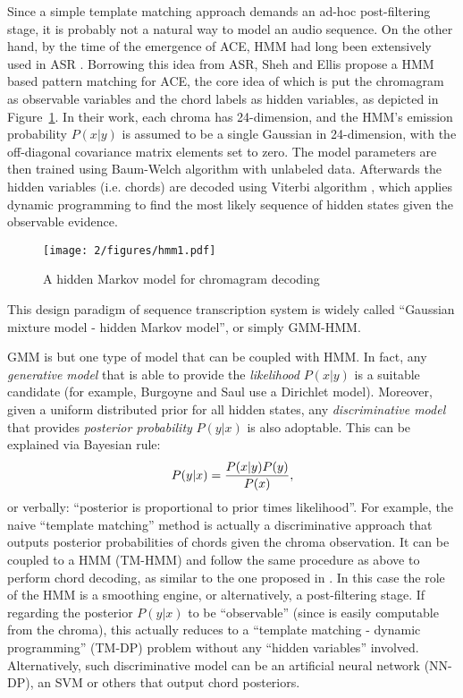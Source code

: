 Since a simple template matching approach demands an ad-hoc post-filtering stage, it is probably not a natural way to model an audio sequence. On the other hand, by the time of the emergence of ACE, HMM had long been extensively used in ASR \cite{rabiner1989tutorial,huang1990hidden}. Borrowing this idea from ASR, Sheh and Ellis \cite{sheh2003chord} propose a HMM based pattern matching for ACE, the core idea of which is put the chromagram as observable variables and the chord labels as hidden variables, as depicted in Figure~\ref{fig:2-hmm1}. In their work, each chroma has 24-dimension, and the HMM's emission probability $P(x|y)$ is assumed to be a single Gaussian in 24-dimension, with the off-diagonal covariance matrix elements set to zero. The model parameters are then trained using Baum-Welch algorithm \cite{baum1970maximization} with unlabeled data. Afterwards the hidden variables (i.e. chords) are decoded using Viterbi algorithm \cite{rabiner1989tutorial}, which applies dynamic programming to find the most likely sequence of hidden states given the observable evidence.
\begin{figure}[htb]
\centering
\texttt{[image: 2/figures/hmm1.pdf]}
\caption{A hidden Markov model for chromagram decoding}
\label{fig:2-hmm1}
\end{figure}
This design paradigm of sequence transcription system is widely called ``Gaussian mixture model - hidden Markov model'', or simply GMM-HMM.

GMM is but one type of model that can be coupled with HMM. In fact, any {\it generative model} that is able to provide the {\it likelihood} $P(x|y)$ is a suitable candidate (for example, Burgoyne and Saul \cite{burgoyne2005learning} use a Dirichlet model). Moreover, given a uniform distributed prior for all hidden states, any {\it discriminative model} that provides {\it posterior probability} $P(y|x)$ is also adoptable. This can be explained via Bayesian rule:
\begin{equation}
P(y|x) = {P(x|y)P(y) \over P(x)},
\end{equation}
or verbally: ``posterior is proportional to prior times likelihood''. For example, the naive ``template matching'' method is actually a discriminative approach that outputs posterior probabilities of chords given the chroma observation. It can be coupled to a HMM (TM-HMM) and follow the same procedure as above to perform chord decoding, as similar to the one proposed in \cite{ryynanen2008automatic}. In this case the role of the HMM is a smoothing engine, or alternatively, a post-filtering stage. If regarding the posterior $P(y|x)$ to be ``observable'' (since is easily computable from the chroma), this actually reduces to a ``template matching - dynamic programming'' (TM-DP) problem without any ``hidden variables'' involved. Alternatively, such discriminative model can be an artificial neural network \cite{zhang2008chord} (NN-DP), an SVM \cite{weller2009structured} or others that output chord posteriors.

